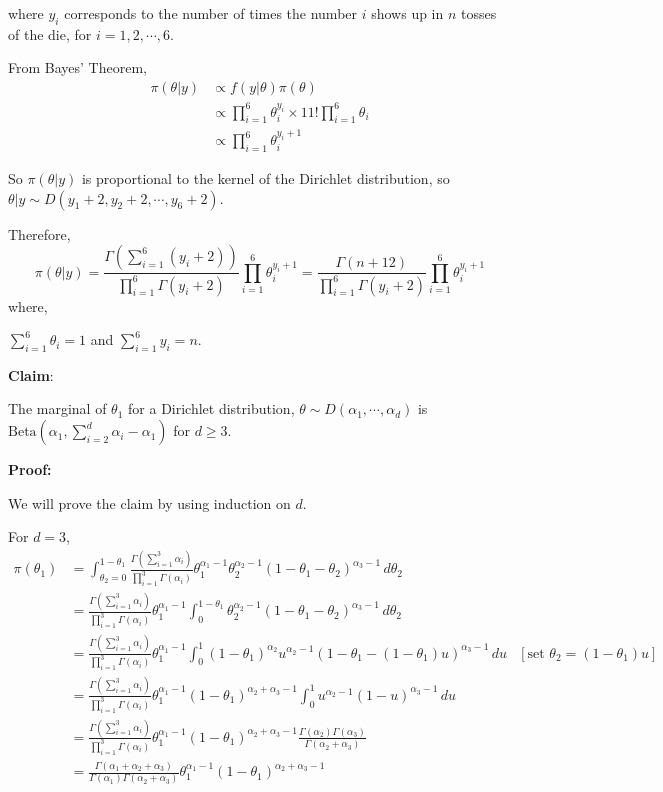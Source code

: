 \documentclass[a4paper]{article}
\begin{document}
where \(y_i\) corresponds to the number of times the number \(i\) shows up in \(n\) tosses of the die, for \(i = 1,2, \cdots, 6\).

From Bayes' Theorem,
\begin{align*}
    \pi(\theta|y) &\propto f(y|\theta) \pi(\theta)\\
    &\propto \prod_{i=1}^{6} \theta_i^{y_i} \times 11! \prod_{i=1}^{6} \theta_i\\
    &\propto \prod_{i=1}^{6} \theta_i^{y_i + 1}
\end{align*}

So \(\pi(\theta|y)\) is proportional to the kernel of the Dirichlet distribution, so \(\theta|y \sim D(y_1+2,y_2+2, \cdots, y_6+2)\).

Therefore,
\[
    \pi(\theta|y) = \frac{\Gamma\left(\sum_{i=1}^{6} (y_i + 2)\right)}{\prod_{i=1}^{6} \Gamma(y_i +2)} \prod_{i=1}^{6} \theta_i^{y_i + 1}
    = \frac{\Gamma\left(n+12\right)}{\prod_{i=1}^{6} \Gamma(y_i +2)} \prod_{i=1}^{6} \theta_i^{y_i + 1}
\]
where, 

\(\sum_{i=1}^{6} \theta_i = 1\) and \(\sum_{i=1}^{6} y_i = n\).

\noindent \textbf{Claim}: 

The marginal of \(\theta_1\) for a Dirichlet distribution, \(\theta \sim D(\alpha_1,\cdots,\alpha_d)\) is \(\text{Beta}\left(\alpha_1,\sum_{i=2}^{d} \alpha_i - \alpha_1\right)\) for \(d \geq 3\).

\noindent \textbf{Proof:}

We will prove the claim by using induction on \(d\).

For \(d = 3\),
\begin{align*}
    \pi(\theta_1) &= \int_{\theta_2 = 0}^{1-\theta_1} \frac{\Gamma(\sum_{i=1}^{3} \alpha_i)}{\prod_{i=1}^{3} \Gamma(\alpha_i)} \theta_1^{\alpha_1-1}\theta_2^{\alpha_2-1} (1 - \theta_1 - \theta_2)^{\alpha_3-1} \, d\theta_2\\
    &= \frac{\Gamma(\sum_{i=1}^{3} \alpha_i)}{\prod_{i=1}^{3} \Gamma(\alpha_i)}\theta_1^{\alpha_1-1} \int_{0}^{1-\theta_1} \theta_2^{\alpha_2-1} (1- \theta_1 - \theta_2)^{\alpha_3-1} \, d\theta_2\\
    &=\frac{\Gamma(\sum_{i=1}^{3} \alpha_i)}{\prod_{i=1}^{3} \Gamma(\alpha_i)}\theta_1^{\alpha_1-1} \int_{0}^{1}  (1-\theta_1)^{\alpha_2} u^{\alpha_2 - 1}\left(1 - \theta_1 - (1-\theta_1) u\right)^{\alpha_3-1} \,du  & [\text{set }\theta_2 = (1 - \theta_1)u]\\
    &=\frac{\Gamma(\sum_{i=1}^{3} \alpha_i)}{\prod_{i=1}^{3} \Gamma(\alpha_i)}\theta_1^{\alpha_1-1}(1-\theta_1)^{\alpha_2+\alpha_3-1} \int_{0}^{1}   u^{\alpha_2 - 1}(1 - u)^{\alpha_3-1} \,du\\
    &= \frac{\Gamma(\sum_{i=1}^{3} \alpha_i)}{\prod_{i=1}^{3} \Gamma(\alpha_i)}\theta_1^{\alpha_1-1}(1-\theta_1)^{\alpha_2+\alpha_3-1} \frac{\Gamma(\alpha_2)\Gamma(\alpha_3)}{\Gamma(\alpha_2 + \alpha_3)}\\
    &= \frac{\Gamma(\alpha_1 + \alpha_2 + \alpha_3)}{\Gamma(\alpha_1)\Gamma(\alpha_2 + \alpha_3)}\theta_1^{\alpha_1-1}(1-\theta_1)^{\alpha_2+\alpha_3-1} 
\end{align*}
\end{document}
